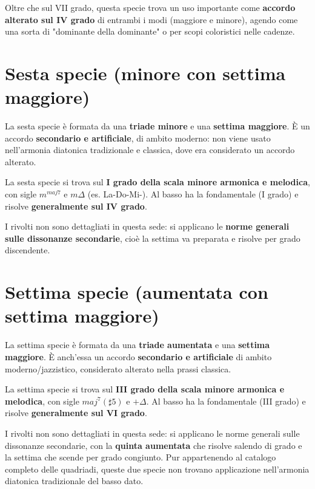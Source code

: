 Oltre che sul VII grado, questa specie trova un uso importante come \textbf{accordo alterato sul IV grado} di entrambi i modi (maggiore e minore), agendo come una sorta di "dominante della dominante" o per scopi coloristici nelle cadenze.

\section{Sesta specie (minore con settima maggiore)}
\label{sec:sesta_specie_dettaglio}

La sesta specie è formata da una \textbf{triade minore} e una \textbf{settima maggiore}. È un accordo \textbf{secondario e artificiale}, di ambito moderno: non viene usato nell'armonia diatonica tradizionale e classica, dove era considerato un accordo alterato.

\begin{regola}
	\label{reg:sesta_specie}
	La sesta specie si trova sul \textbf{I grado della scala minore armonica e melodica}, con sigle $m^{maj7}$ e $m\Delta$ (es. La-Do-Mi-\Soldiesis). Al basso ha la fondamentale (I grado) e risolve \textbf{generalmente sul IV grado}.
\end{regola}

I rivolti non sono dettagliati in questa sede: si applicano le \textbf{norme generali sulle dissonanze secondarie}, cioè la settima va preparata e risolve per grado discendente.

\section{Settima specie (aumentata con settima maggiore)}
\label{sec:settima_specie_dettaglio}

La settima specie è formata da una \textbf{triade aumentata} e una \textbf{settima maggiore}. È anch'essa un accordo \textbf{secondario e artificiale} di ambito moderno/jazzistico, considerato alterato nella prassi classica.

\begin{regola}
	\label{reg:settima_specie}
	La settima specie si trova sul \textbf{III grado della scala minore armonica e melodica}, con sigle $maj^7(\sharp5)$ e $+\Delta$. Al basso ha la fondamentale (III grado) e risolve \textbf{generalmente sul VI grado}.
\end{regola}

I rivolti non sono dettagliati in questa sede: si applicano le norme generali sulle dissonanze secondarie, con la \textbf{quinta aumentata} che risolve salendo di grado e la settima che scende per grado congiunto. Pur appartenendo al catalogo completo delle quadriadi, queste due specie non trovano applicazione nell'armonia diatonica tradizionale del basso dato.
